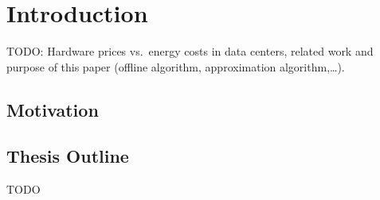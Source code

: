 
\chapter{Introduction}
TODO: Hardware prices vs.\ energy costs in data centers, related work and purpose of this paper (offline algorithm, approximation algorithm,\ldots).
\section{Motivation}

\section{Thesis Outline}
TODO
